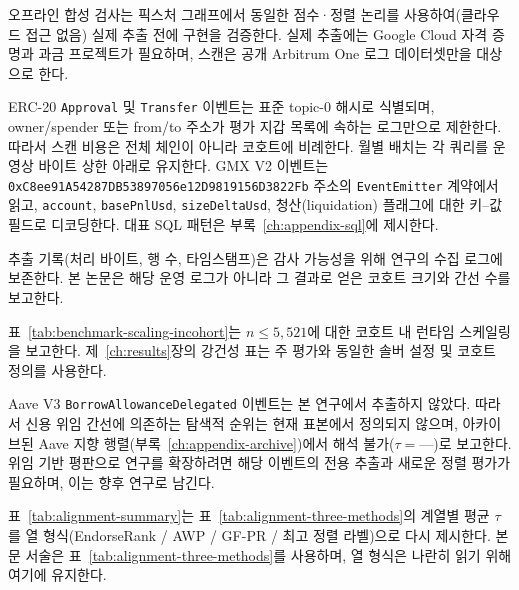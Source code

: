 오프라인 합성 검사는 픽스처 그래프에서 동일한 점수·정렬 논리를 사용하여(클라우드 접근 없음) 실제 추출 전에 구현을 검증한다. 실제 추출에는 Google Cloud 자격 증명과 과금 프로젝트가 필요하며, 스캔은 공개 Arbitrum One 로그 데이터셋만을 대상으로 한다.


ERC-20 \texttt{Approval} 및 \texttt{Transfer} 이벤트는 표준 topic-$0$ 해시로 식별되며, owner/spender 또는 from/to 주소가 평가 지갑 목록에 속하는 로그만으로 제한한다. 따라서 스캔 비용은 전체 체인이 아니라 코호트에 비례한다. 월별 배치는 각 쿼리를 운영상 바이트 상한 아래로 유지한다. GMX V2 이벤트는
\texttt{0xC8ee91A54287DB53897056e12D9819156D3822Fb}
주소의 \texttt{EventEmitter} 계약에서 읽고, \texttt{account}, \texttt{basePnlUsd}, \texttt{sizeDeltaUsd}, 청산(liquidation) 플래그에 대한 키--값 필드로 디코딩한다. 대표 SQL 패턴은 부록~\ref{ch:appendix-sql}에 제시한다.

추출 기록(처리 바이트, 행 수, 타임스탬프)은 감사 가능성을 위해 연구의 수집 로그에 보존한다. 본 논문은 해당 운영 로그가 아니라 그 결과로 얻은 코호트 크기와 간선 수를 보고한다.


표~\ref{tab:benchmark-scaling-incohort}는 $n \leq 5{,}521$에 대한 코호트 내 런타임 스케일링을 보고한다. 제~\ref{ch:results}장의 강건성 표는 주 평가와 동일한 솔버 설정 및 코호트 정의를 사용한다.




Aave V3 \texttt{BorrowAllowanceDelegated} 이벤트는 본 연구에서 추출하지 않았다. 따라서 신용 위임 간선에 의존하는 탐색적 순위는 현재 표본에서 정의되지 않으며, 아카이브된 Aave 지향 행렬(부록~\ref{ch:appendix-archive})에서 해석 불가($\tau = \text{---}$)로 보고한다. 위임 기반 평판으로 연구를 확장하려면 해당 이벤트의 전용 추출과 새로운 정렬 평가가 필요하며, 이는 향후 연구로 남긴다.


표~\ref{tab:alignment-summary}는 표~\ref{tab:alignment-three-methods}의 계열별 평균 $\tau$를 열 형식(EndorseRank / AWP / GF-PR / 최고 정렬 라벨)으로 다시 제시한다. 본문 서술은 표~\ref{tab:alignment-three-methods}를 사용하며, 열 형식은 나란히 읽기 위해 여기에 유지한다.


